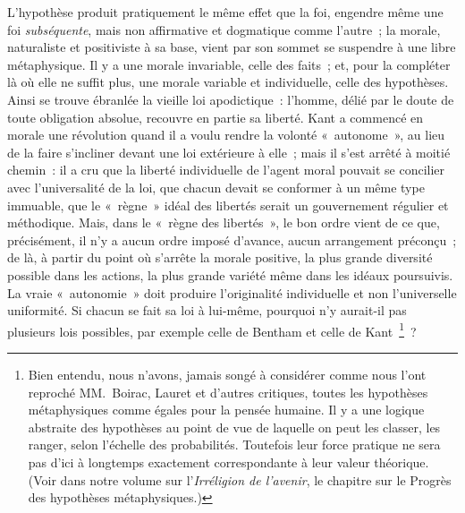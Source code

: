 \documentclass[french,twoside]{book} %
\begin{document}
L’hypothèse produit pratiquement le même effet que la foi, engendre même une foi \emph{subséquente}, mais non affirmative et dogmatique comme l’autre ; la morale, naturaliste et positiviste à sa base, vient par son sommet se suspendre à une libre métaphysique. Il y a une morale invariable, celle des faits ; et, pour la compléter là où elle ne suffit plus, une morale variable et individuelle, celle des hypothèses. Ainsi se trouve ébranlée la vieille loi apodictique : l’homme, délié par le doute de toute obligation absolue, recouvre en partie sa liberté. Kant a commencé en morale une révolution quand il a voulu rendre la volonté « autonome », au lieu de la faire s’incliner devant une loi extérieure à elle ; mais il s’est arrêté à moitié chemin : il a cru que la liberté individuelle de l’agent moral pouvait se concilier avec l’universalité de la loi, que chacun devait se conformer à un même type immuable, que le « règne » idéal des libertés serait un gouvernement régulier et méthodique. Mais, dans le « règne des libertés », le bon ordre vient de ce que, précisément, il n’y a aucun ordre imposé d’avance, aucun arrangement préconçu ; de là, à partir du point où s’arrête la morale positive, la plus grande diversité possible dans les actions, la plus grande variété même dans les idéaux poursuivis. La vraie « autonomie » doit produire l’originalité individuelle et non l’universelle uniformité. Si chacun se fait sa loi à lui-même, pourquoi n’y aurait-il pas plusieurs lois possibles, par exemple celle de Bentham et celle de Kant \footnote{Bien entendu, nous n’avons, jamais songé à considérer comme nous l’ont reproché MM. Boirac, Lauret et d’autres critiques, toutes les hypothèses métaphysiques comme égales pour la pensée humaine. Il y a une logique abstraite des hypothèses au point de vue de laquelle on peut les classer, les ranger, selon l’échelle des probabilités. Toutefois leur force pratique ne sera pas d’ici à longtemps exactement correspondante à leur valeur théorique. (Voir dans notre volume sur l’\emph{Irréligion de l’avenir}, le chapitre sur le Progrès des hypothèses métaphysiques.)} ?\par
\end{document}
